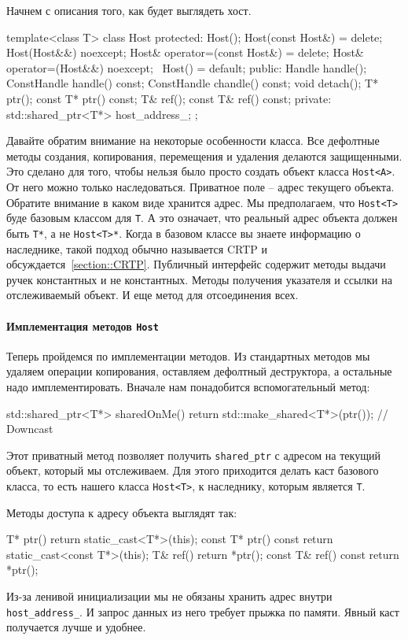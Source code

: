 Начнем с описания того, как будет выглядеть хост.
\begin{cppcode}
template<class T>
class Host {
protected:
  Host();
  Host(const Host&) = delete;
  Host(Host&&) noexcept;
  Host& operator=(const Host&) = delete;
  Host& operator=(Host&&) noexcept;
  ~Host() = default;
public:
  Handle handle();
  ConstHandle handle() const;
  ConstHandle chandle() const;
  void detach();
  T* ptr();
  const T* ptr() const;
  T& ref();
  const T& ref() const;
private:
  std::shared_ptr<T*> host_address_;
};
\end{cppcode}
Давайте обратим внимание на некоторые особенности класса.
Все дефолтные методы создания, копирования, перемещения и удаления делаются защищенными.
Это сделано для того, чтобы нельзя было просто создать объект класса \verb"Host<A>".
От него можно только наследоваться.
Приватное поле -- адрес текущего объекта.
Обратите внимание в каком виде хранится адрес.
Мы предполагаем, что \verb"Host<T>" буде базовым классом для \verb"T".
А это означает, что реальный адрес объекта должен быть \verb"T*", а не \verb"Host<T>*".
Когда в базовом классе вы знаете информацию о наследнике, такой подход обычно называется CRTP и обсуждается~\ref{section::CRTP}.
Публичный интерфейс содержит методы выдачи ручек константных и не константных.
Методы получения указателя и ссылки на отслеживаемый объект.
И еще метод для отсоединения всех.

\paragraph{Имплементация методов \texttt{Host}}

Теперь пройдемся по имплементации методов.
Из стандартных методов мы удаляем операции копирования, оставляем дефолтный деструктора, а остальные надо имплементировать.
Вначале нам понадобится вспомогательный метод:
\begin{cppcode}
std::shared_ptr<T*> sharedOnMe() {
  return std::make_shared<T*>(ptr()); } // Downcast
\end{cppcode}
Этот приватный метод позволяет получить \verb"shared_ptr" с адресом на текущий объект, который мы отслеживаем.
Для этого приходится делать каст базового класса, то есть нашего класса \verb"Host<T>", к наследнику, которым является \verb"T".

Методы доступа к адресу объекта выглядят так:
\begin{cppcode}
  T* ptr() {
    return static_cast<T*>(this);
  }
  const T* ptr() const {
    return static_cast<const T*>(this);
  }
  T& ref() {
    return *ptr();
  }
  const T& ref() const {
    return *ptr();
  }  
\end{cppcode}
Из-за ленивой инициализации мы не обязаны хранить адрес внутри \verb"host_address_".
И запрос данных из него требует прыжка по памяти.
Явный каст получается лучше и удобнее.

